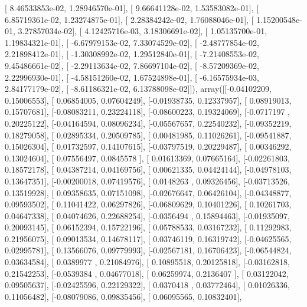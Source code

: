 \documentclass{article}
\begin{document}
       [  8.46533853e-02,   1.28946570e-01],
       [  9.66641128e-02,   1.53583082e-01],
       [  6.85719361e-02,   1.23274875e-01],
       [  2.28384242e-02,   1.76088046e-01],
       [  1.15200548e-01,   3.27857034e-02],
       [  4.12425716e-03,   3.18306691e-02],
       [  1.05135700e-01,   1.19834321e-01],
       [ -6.67979153e-02,   7.33074529e-02],
       [ -2.48777854e-02,   2.21898412e-01],
       [ -1.30308992e-02,   1.29512840e-01],
       [ -7.21408553e-02,   9.45486661e-02],
       [ -2.29113634e-02,   7.86697104e-02],
       [ -8.57209369e-02,   2.22996930e-01],
       [ -4.58151260e-02,   1.67524898e-01],
       [ -6.16575934e-03,   2.84177179e-02],
       [ -8.61186321e-02,   6.13788098e-02]]), array([[-0.04102209,  0.15006553],
       [ 0.06854005,  0.07604249],
       [-0.01938735,  0.12337957],
       [ 0.08919013,  0.15707681],
       [-0.08083211,  0.23224118],
       [-0.08600223,  0.19324069],
       [-0.0717197 ,  0.20225122],
       [-0.04164594,  0.08096234],
       [-0.05567657,  0.22540232],
       [-0.09352219,  0.18279058],
       [ 0.02895334,  0.20509785],
       [ 0.00481985,  0.11026261],
       [-0.09541887,  0.15026304],
       [ 0.01732597,  0.14107615],
       [-0.03797519,  0.20229487],
       [ 0.00346292,  0.13024604],
       [ 0.07556497,  0.0845578 ],
       [ 0.01613369,  0.07665164],
       [-0.02261803,  0.18572178],
       [ 0.04387214,  0.04169756],
       [ 0.00621335,  0.04424144],
       [-0.04978103,  0.13647351],
       [-0.00200018,  0.07419576],
       [ 0.0148263 ,  0.09326456],
       [-0.03713526,  0.13519928],
       [ 0.09358635,  0.07151098],
       [-0.02676647,  0.06426104],
       [-0.04348877,  0.09593502],
       [ 0.11041422,  0.06297826],
       [-0.06809629,  0.10401226],
       [ 0.10261703,  0.04647338],
       [ 0.04074626,  0.22688254],
       [-0.0356494 ,  0.15894463],
       [-0.01935097,  0.20093145],
       [ 0.06152394,  0.15722196],
       [ 0.05788533,  0.03167232],
       [ 0.11292983,  0.21956075],
       [ 0.09013534,  0.14678117],
       [ 0.03746119,  0.16319742],
       [-0.04625565,  0.02995781],
       [ 0.13566076,  0.09779993],
       [-0.02567181,  0.16706423],
       [-0.06544824,  0.03634584],
       [ 0.0389977 ,  0.21084976],
       [ 0.10895518,  0.20125818],
       [-0.03162818,  0.21542253],
       [-0.0539384 ,  0.04677018],
       [ 0.06259974,  0.2136407 ],
       [ 0.03122042,  0.09505637],
       [-0.02425596,  0.22129322],
       [ 0.0370418 ,  0.03772464],
       [ 0.01026336,  0.11056482],
       [-0.08079086,  0.09835456],
       [ 0.06095565,  0.10832401],
\end{document}
